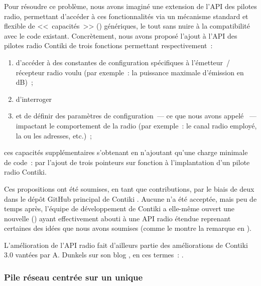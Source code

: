 Pour résoudre ce problème, nous avons imaginé une extension de l'API des
pilotes radio, permettant d'accéder à ces fonctionnalités via un mécanisme
standard et flexible de <<~capacités~>> () génériques,
le tout sans nuire à la compatibilité avec le code existant.
Concrètement, nous avons proposé l'ajout à l'API des pilotes radio Contiki
de trois fonctions permettant respectivement~:
\begin{enumerate}
\item d'accéder à des constantes de configuration spécifiques à l'émetteur~/
récepteur radio voulu (par exemple~: la puissance maximale d'émission en dB)~;
\item d'interroger
\item et de définir des paramètres de configuration~--- ce que nous avons
appelé ~--- impactant le comportement de la radio
(par exemple~: le canal radio employé, la ou les adresses, etc.)~;
\end{enumerate}
ces capacités supplémentaires s'obtenant en n'ajoutant qu'une charge
minimale de code~: par l'ajout de trois pointeurs sur fonction
à l'implantation d'un pilote radio Contiki.

Ces propositions ont été soumises, en tant que contributions, par le biais
de deux  dans le dépôt GitHub principal de Contiki
\cite{PRContiki1} \cite{PRContiki2}. Aucune n'a été acceptée, mais peu
de temps après, l'équipe de développement de Contiki a elle-même ouvert
une nouvelle  (\cite{PRContiki3}) ayant effectivement
abouti à une API radio étendue reprenant certaines des idées que nous avons
soumises (comme le montre la remarque 
en \cite{PRContiki3}).

L'amélioration de l'API radio fait d'ailleurs partie des améliorations de
Contiki 3.0 vantées par A. Dunkels sur son blog \cite{Contiki3Annonce},
en ces termes~: .

\subsubsection{Pile réseau centrée sur un unique }
\label{ParContikiPacketbuf}

